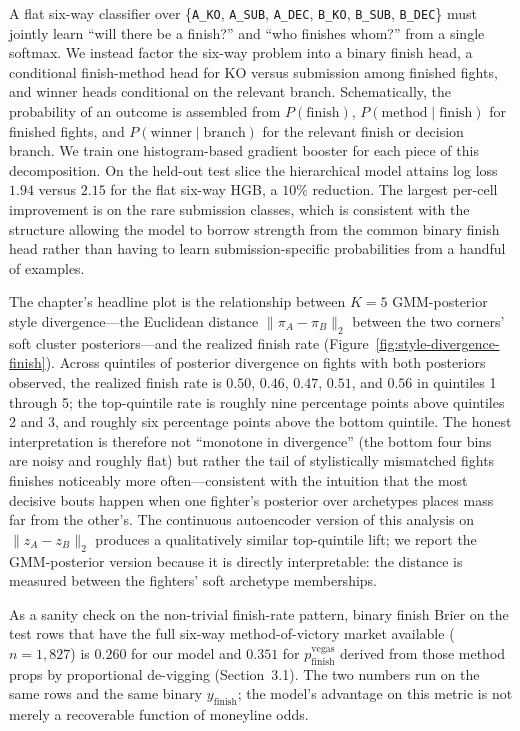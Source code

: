 \documentclass[12pt,oneside]{report}
\begin{document}
A flat six-way classifier over \{\texttt{A\_KO}, \texttt{A\_SUB},
\texttt{A\_DEC}, \texttt{B\_KO}, \texttt{B\_SUB}, \texttt{B\_DEC}\}
must jointly learn ``will there be a finish?'' and ``who finishes
whom?'' from a single softmax.  We instead factor the six-way problem into a binary finish head, a conditional finish-method head for KO versus submission among finished fights, and winner heads conditional on the relevant branch.  Schematically, the probability of an outcome is assembled from \(P(\mathrm{finish})\), \(P(\mathrm{method}\mid \mathrm{finish})\) for finished fights, and \(P(\mathrm{winner}\mid \mathrm{branch})\) for the relevant finish or decision branch.  We train one histogram-based gradient booster
\citep{friedman2001greedy} for each piece of this decomposition.  On the held-out
test slice the hierarchical model attains log loss $1.94$ versus
$2.15$ for the flat six-way HGB, a $10\%$ reduction.  The largest
per-cell improvement is on the rare submission classes, which is consistent with the structure allowing the model to borrow strength from
the common binary finish head rather than having to learn
submission-specific probabilities from a handful of examples.

The chapter's headline plot is the relationship between
\(K = 5\) GMM-posterior style divergence---the Euclidean
distance \(\lVert \pi_A - \pi_B \rVert_2\) between the two corners'
soft cluster posteriors---and the realized finish rate
(Figure~\ref{fig:style-divergence-finish}).  Across quintiles of
posterior divergence on fights with both posteriors observed, the
realized finish rate is $0.50$, $0.46$, $0.47$, $0.51$, and $0.56$
in quintiles 1 through 5; the top-quintile rate is roughly nine
percentage points above quintiles 2 and 3, and roughly six
percentage points above the bottom quintile.  The honest
interpretation is therefore not ``monotone in divergence'' (the
bottom four bins are noisy and roughly flat) but rather the
tail of stylistically mismatched fights finishes noticeably more
often---consistent with the intuition that the most decisive bouts happen
when one fighter's posterior over archetypes places mass far from
the other's.  The continuous autoencoder version of this analysis
on \(\lVert z_A - z_B \rVert_2\) produces a qualitatively similar
top-quintile lift; we report the GMM-posterior version because it is directly interpretable: the distance is measured between the fighters' soft archetype memberships.

As a sanity check on the non-trivial finish-rate pattern, binary
finish Brier on the test rows that have the full six-way
method-of-victory market available (\(n = 1{,}827\)) is $0.260$ for our
model and $0.351$ for \(p_{\mathrm{finish}}^{\mathrm{vegas}}\) derived
from those method props by proportional de-vigging
(Section~3.1).  The two numbers run on the same rows and the same
binary $y_{\text{finish}}$; the model's advantage on this metric is
not merely a recoverable function of moneyline odds.
\end{document}
